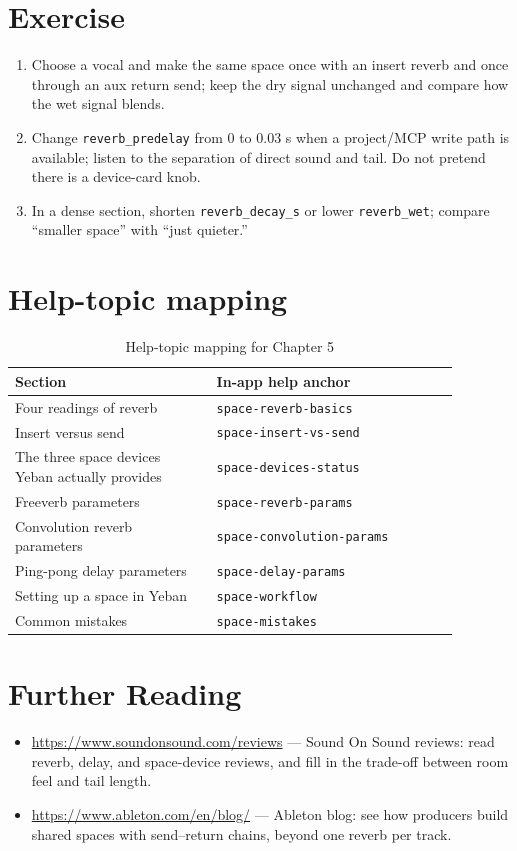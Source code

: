 \section{Exercise}


\begin{exercise}
\begin{enumerate}
  \item Choose a vocal and make the same space once with an insert reverb and once through an aux return send; keep the dry signal unchanged and compare how the wet signal blends.
  \item Change \texttt{reverb\_predelay} from 0 to 0.03 s when a project/MCP write path is available; listen to the separation of direct sound and tail. Do not pretend there is a device-card knob.
  \item In a dense section, shorten \texttt{reverb\_decay\_s} or lower \texttt{reverb\_wet}; compare ``smaller space'' with ``just quieter.''
\end{enumerate}
\end{exercise}

\section{Help-topic mapping}

\begin{table}[htbp]
\centering
\small
\begin{tabular}{@{}p{0.40\linewidth}p{0.48\linewidth}@{}}
\hline
Section & In-app help anchor \\
\hline
Four readings of reverb & \texttt{space-reverb-basics} \\
Insert versus send & \texttt{space-insert-vs-send} \\
The three space devices Yeban actually provides & \texttt{space-devices-status} \\
Freeverb parameters & \texttt{space-reverb-params} \\
Convolution reverb parameters & \texttt{space-convolution-params} \\
Ping-pong delay parameters & \texttt{space-delay-params} \\
Setting up a space in Yeban & \texttt{space-workflow} \\
Common mistakes & \texttt{space-mistakes} \\
\hline
\end{tabular}
\caption{Help-topic mapping for Chapter 5}
\end{table}

\section*{Further Reading}
\begin{itemize}[leftmargin=1.5em]
\item \url{https://www.soundonsound.com/reviews} — Sound On Sound reviews: read reverb, delay, and space-device reviews, and fill in the trade-off between room feel and tail length.
\item \url{https://www.ableton.com/en/blog/} — Ableton blog: see how producers build shared spaces with send–return chains, beyond one reverb per track.
\end{itemize}

